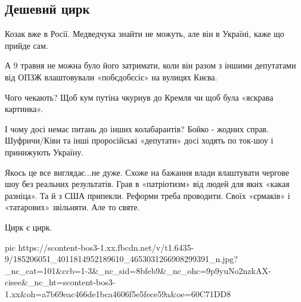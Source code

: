  
 
 
 
 

\subsection{Дешевий цирк}

Козак вже в Росії. Медведчука знайти не можуть, але він в Україні, каже що прийде сам.

А 9 травня не можна було його затримати, коли він разом з іншими депутатами від
ОПЗЖ влаштовували «побєдобєсіє» на вулицях Києва. 

Чого чекають? Щоб кум путіна чкурнув до Кремля чи щоб була «яскрава картинка». 

І чому досі немає питань до інших колабарантів? Бойко - жодних справ.
Шуфричи/Ківи та інші проросійські «депутати» досі ходять по ток-шоу і
принижують Україну. 

Якось це все виглядає...не дуже. Схоже на бажання влади влаштувати чергове шоу
без реальних результатів. Грав в «патріотизм» від людей для яких «какая
разніца». Та й з США припекли. Реформи треба проводити. Своїх «єрмаків» і
«татарових» звільняти. Але то святе. 

Цирк є цирк.

\ifcmt
  pic https://scontent-bos3-1.xx.fbcdn.net/v/t1.6435-9/185206051_4011814952189610_4653031266908299391_n.jpg?_nc_cat=101&ccb=1-3&_nc_sid=8bfeb9&_nc_ohc=9p9yuNo2nzkAX-cisee&_nc_ht=scontent-bos3-1.xx&oh=a7b69eac466de1bca4606f5e5fece59a&oe=60C71DD8
\fi
